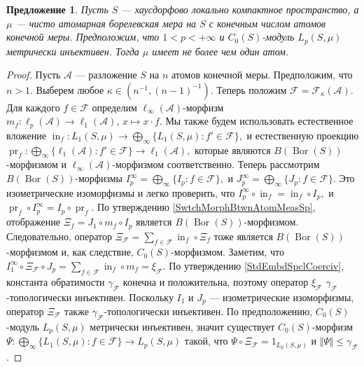 \documentclass[12pt]{article}
\newtheorem{proposition}[theorem]{Предложение}
\begin{document}
\begin{proposition}\label{MetInjC0SModLpSmuOnFinAtmMeasSpCharac}
    Пусть $S$ --- хаусдорфово локально компактное пространство, а $\mu$ --- 
    чисто атомарная борелевская мера на $S$ с конечным числом атомов конечной 
    меры. Предположим, что $1<p<+\infty$ и $C_0(S)$-модуль $L_p(S,\mu)$ 
    метрически инъективен. Тогда $\mu$ имеет не более чем один атом.
\end{proposition}
\begin{proof}
    Пусть $\mathcal{A}$ --- разложение $S$ на $n$ атомов конечной меры. 
    Предположим, что $n>1$. Выберем любое $\kappa\in(n^{-1}, (n-1)^{-1})$. 
    Теперь положим $\mathcal{F}=\mathcal{F}_{\kappa}(\mathcal{A})$. Для 
    каждого $f\in \mathcal{F}$ определим $\ell_\infty(\mathcal{A})$-морфизм 
    $
        m_f:
        \ell_p(\mathcal{A})\to\ell_1(\mathcal{A}),\,
        x\mapsto x\cdot f.
    $
    Мы также будем использовать естественное вложение 
    $
        \operatorname{in}_f:
        L_1(S,\mu)\to\bigoplus_\infty\{L_1(S,\mu):f'\in\mathcal{F}\},
    $
    и естественную проекцию
    $
        \operatorname{pr}_f:
        \bigoplus_\infty\{
            \ell_1(\mathcal{A}):f'\in\mathcal{F}
        \}\to\ell_1(\mathcal{A}),
    $
    которые являются $B(\operatorname{Bor}(S))$-морфизмом 
    и $\ell_\infty(\mathcal{A})$-морфизмом соответственно. Теперь 
    рассмотрим $B(\operatorname{Bor}(S))$-морфизмы 
    $
        I_p^\infty=\bigoplus_\infty\{I_p:f\in\mathcal{F}\},
    $
    и
    $
        J_p^\infty=\bigoplus_\infty\{J_p:f\in\mathcal{F}\}.
    $
    Это изометрические изоморфизмы и легко проверить, что 
    $
        I_p^\infty \circ \operatorname{in}_f=\operatorname{in}_f\circ I_p,
    $
    и
    $
        \operatorname{pr}_f\circ I_p^\infty=I_p\circ \operatorname{pr}_f.
    $
    По утверждению \ref{SwtchMorphBtwnAtomMeasSp}, 
    отображение $\Xi_f=J_1\circ m_f\circ I_p$ 
    является $B(\operatorname{Bor}(S))$-морфизмом. Следовательно, оператор 
    $
        \Xi_{\mathcal{F}}=\sum_{f\in\mathcal{F}}\operatorname{in}_f\circ \Xi_f
    $
    тоже является $B(\operatorname{Bor}(S))$-морфизмом и, как 
    следствие, $C_0(S)$-морфизмом. Заметим, что
    $
        I_1^\infty\circ\Xi_\mathcal{F}\circ J_p
        = \sum_{f\in\mathcal{F}} 
            \operatorname{in}_f\circ m_f 
        =\xi_{\mathcal{F}}.
    $
    По утверждению \ref{StdEmbdSpclCoerciv}, константа 
    обратимости $\gamma_{\mathcal{F}}$ конечна и положительна, 
    поэтому оператор $\xi_{\mathcal{F}}$ $\gamma_{\mathcal{F}}$-топологически 
    инъективен. Поскольку $I_1$ и $J_p$ --- изометрические изоморфизмы, 
    оператор $\Xi_{\mathcal{F}}$ также $\gamma_{\mathcal{F}}$-топологически 
    инъективен. По предположению, $C_0(S)$-модуль $L_p(S,\mu)$ 
    метрически инъективен, значит существует $C_0(S)$-морфизм 
    $
        \Psi:
        \bigoplus_\infty\{ L_1(S,\mu):f\in\mathcal{F}\}\to L_p(S,\mu)
    $
    такой, что $\Psi\circ \Xi_{\mathcal{F}}=1_{L_p(S,\mu)}$ 
    и $\Vert \Psi\Vert\leq \gamma_{\mathcal{F}}$.


\end{proof}
\end{document}
